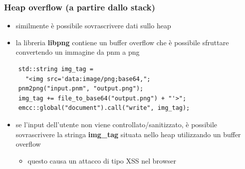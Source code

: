 \documentclass{beamer}
\begin{document}
\begin{frame}[fragile]
  \frametitle{Heap overflow (a partire dallo stack)}
  \begin{itemize}
    \item similmente è possibile sovrascrivere dati sullo heap
    \pause
    \item la libreria \textbf{libpng} contiene un buffer overflow che
      è possibile sfruttare convertendo un immagine da pnm a png 
  \pause
  \end{itemize}
  \vspace{0.15in}
  \begin{verbatim}
    std::string img_tag = 
      "<img src='data:image/png;base64,";
    pnm2png("input.pnm", "output.png");        
    img_tag += file_to_base64("output.png") + "'>";
    emcc::global("document").call("write", img_tag);
  \end{verbatim}
  \vspace{0.15in}
  \pause
  \begin{itemize}
    \item se l'input dell'utente non viene controllato/sanitizzato, è possibile
      sovrascrivere la stringa \textbf{img\_tag} situata nello heap utilizzando
      un buffer overflow
    \begin{itemize}
      \item questo causa un attacco di tipo XSS nel browser
    \end{itemize}
  \end{itemize}
\end{frame}
\end{document}

